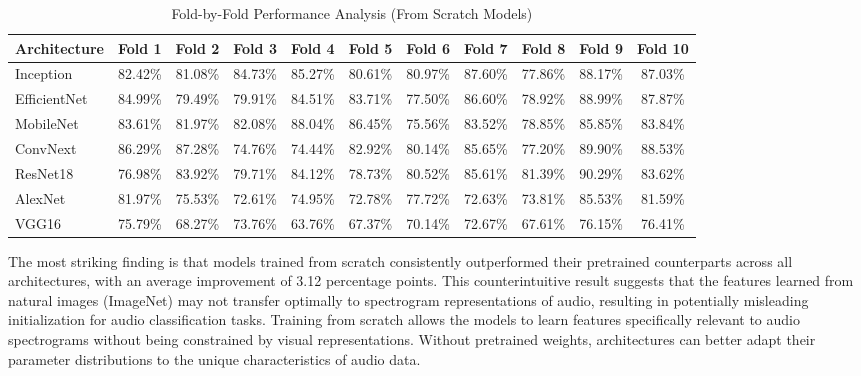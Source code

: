\documentclass[11pt]{article}
\begin{document}
\begin{table}[ht]
    \centering
    \small
    \begin{tabular}{lcccccccccc}
    \toprule
    \textbf{Architecture} & \textbf{Fold 1} & \textbf{Fold 2} & \textbf{Fold 3} & \textbf{Fold 4} & \textbf{Fold 5} & \textbf{Fold 6} & \textbf{Fold 7} & \textbf{Fold 8} & \textbf{Fold 9} & \textbf{Fold 10} \\
    \midrule
    Inception & 82.42\% & 81.08\% & 84.73\% & 85.27\% & 80.61\% & 80.97\% & 87.60\% & 77.86\% & 88.17\% & 87.03\% \\
    EfficientNet & 84.99\% & 79.49\% & 79.91\% & 84.51\% & 83.71\% & 77.50\% & 86.60\% & 78.92\% & 88.99\% & 87.87\% \\
    MobileNet & 83.61\% & 81.97\% & 82.08\% & 88.04\% & 86.45\% & 75.56\% & 83.52\% & 78.85\% & 85.85\% & 83.84\% \\
    ConvNext & 86.29\% & 87.28\% & 74.76\% & 74.44\% & 82.92\% & 80.14\% & 85.65\% & 77.20\% & 89.90\% & 88.53\% \\
    ResNet18 & 76.98\% & 83.92\% & 79.71\% & 84.12\% & 78.73\% & 80.52\% & 85.61\% & 81.39\% & 90.29\% & 83.62\% \\
    AlexNet & 81.97\% & 75.53\% & 72.61\% & 74.95\% & 72.78\% & 77.72\% & 72.63\% & 73.81\% & 85.53\% & 81.59\% \\
    VGG16 & 75.79\% & 68.27\% & 73.76\% & 63.76\% & 67.37\% & 70.14\% & 72.67\% & 67.61\% & 76.15\% & 76.41\% \\
    \bottomrule
    \end{tabular}
    \caption{Fold-by-Fold Performance Analysis (From Scratch Models)}
    \label{tab:fold_analysis}
\end{table}
The most striking finding is that models trained from scratch consistently outperformed their pretrained counterparts across all architectures, with an average improvement of 3.12 percentage points. This counterintuitive result suggests that the features learned from natural images (ImageNet) may not transfer optimally to spectrogram representations of audio, resulting in potentially misleading initialization for audio classification tasks. Training from scratch allows the models to learn features specifically relevant to audio spectrograms without being constrained by visual representations. Without pretrained weights, architectures can better adapt their parameter distributions to the unique characteristics of audio data.
\end{document}
